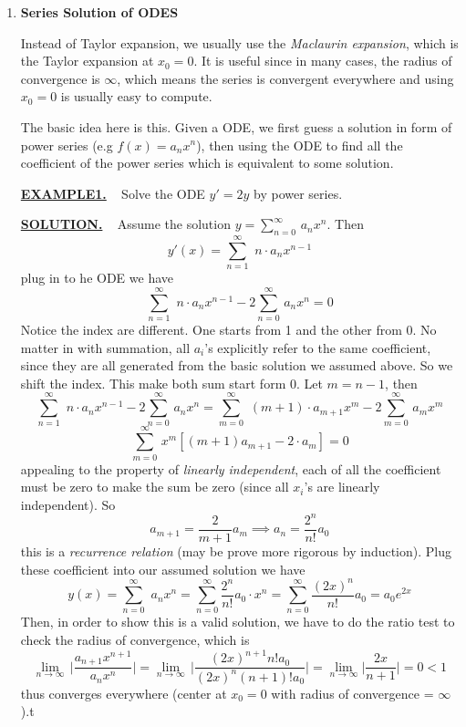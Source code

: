 \documentclass[10pt]{article}
\newenvironment{changemargin}[2]{%
  \begin{list}{}{%
    \setlength{\topsep}{0pt}%
    \setlength{\leftmargin}{#1}%
    \setlength{\rightmargin}{#2}%
    \setlength{\listparindent}{\parindent}%
    \setlength{\itemindent}{\parindent}%
    \setlength{\parsep}{\parskip}%
  }%
  \item[]}{\end{list}}
\begin{document}
\begin{changemargin}{-0.125in}{0in}
\begin{enumerate}
\begin{enumerate}
	   \smallskip
	   
	   \item \textbf{Series Solution of ODES}
	   
	   \smallskip
	   
	   Instead of Taylor expansion, we usually use the \textit{Maclaurin expansion}, which is the Taylor expansion at $x_0 = 0$. It is useful since in many cases, the radius of convergence is $\infty$, which means the series is convergent everywhere and using $x _0 = 0$ is usually easy to compute. 
	   
	   \medskip
	   
	   The basic idea here is this. Given a ODE, we first guess a solution in form of power series (e.g $f(x) =a_nx^n$), then using the ODE to find all the coefficient of the power series which is equivalent to some solution. 
	   
	   \bigskip
	   
	   \underline{\textbf{{EXAMPLE1.}}} \,\,\, Solve the ODE $y' = 2y$ by power series. 
	   
	   \medskip
	   
	   \underline{\textbf{SOLUTION.}} \,\,\, Assume the solution $y = \sum_{n=0}^\infty\,a_n x^n$. Then 
	   \[
	   y'(x) = \sum^\infty_{n = 1}\,\, n \cdot a_n x^{n-1}
	   \]
	   plug in to he ODE we have 
	   \[
	   \sum^\infty_{n = 1}\,\, n \cdot a_n x^{n-1} - 2 \sum_{n=0}^\infty\,a_n x^n = 0
	   \]
	   Notice the index are different. One starts from 1 and the other from 0. No matter in with summation, all $a_i$'s explicitly refer to the same coefficient, since they are all generated from the basic solution we assumed above. So we shift the index. This make both sum start form 0. Let $m = n - 1$, then
	   \[
	   \sum^\infty_{n = 1}\,\, n \cdot a_n x^{n-1} - 2 \sum_{n=0}^\infty\,a_n x^n = \sum^\infty_{m = 0}\,\,(m+1) \cdot a_{m+1} x^{m} - 2 \sum_{m=0}^\infty\,a_m x^m
	   \]
	   \[
	   \sum_{m=0}^\infty\, x^m[(m+1)a_{m+1} - 2 \cdot a_m] = 0
	   \]
	   appealing to the property of \textit{linearly independent}, each of all the coefficient must be zero to make the sum be zero (since all $x_i$'s are linearly independent). So 
	   \[
	   a_{m + 1} = \frac{2}{m+1} a_m \implies a_n = \frac{2^n}{n!}a_0
	   \]
	   this is a \textit{recurrence relation} (may be prove more rigorous by induction). Plug these coefficient into our assumed solution we have 
	   \[
	   y(x) = \sum^\infty_{n = 0} \,\,a_n x^n = \sum^\infty_{n = 0} \frac{2^n}{n!} a_0 \cdot x^n = \sum^\infty_{n = 0} \frac{(2x)^n}{n!} a_0 = a_0 e^{2x}
	   \] 
	   Then, in order to show this is a valid solution, we have to do the ratio test to check the radius of convergence, which is 
	   \[
	   \lim_{n \rightarrow \infty} \, \big|  \frac{a_{n+1}x^{n+1}}{a_n x^n}  \big| = \lim_{n \rightarrow \infty}\,\big|\frac{(2x)^{n+1} n! a_0}{(2x)^n (n+1)! a_0}  \big| = \lim_{n \rightarrow \infty} \big|\frac{2x}{n+1}\big| = 0 < 1
	   \] 
	   thus converges everywhere (center at $x_0 = 0$ with radius of convergence = $\infty$).t
	   \medskip
	   

\end{enumerate}
\end{enumerate}
\end{changemargin}
\end{document}
